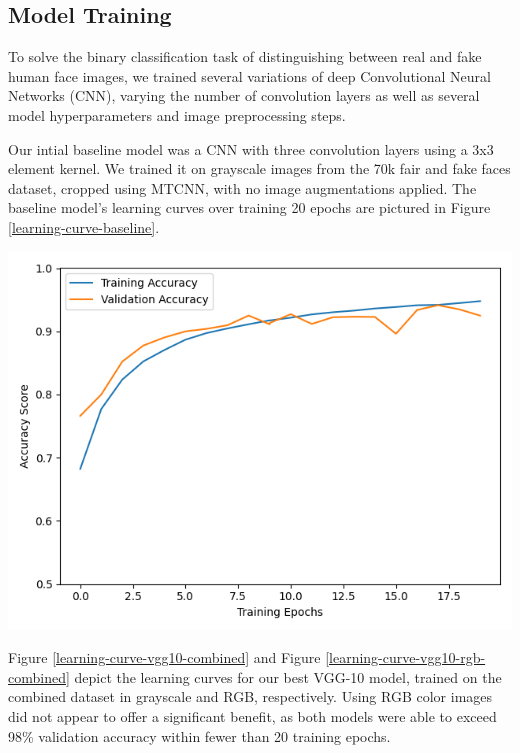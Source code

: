 \documentclass[11pt, letterpaper]{article}
\newenvironment{Figure}
  {\par\medskip\noindent\minipage{\linewidth}}
  {\endminipage\par\medskip}
\begin{document}
\begin{multicols}{2}
  \subsection{Model Training}

  To solve the binary classification task of distinguishing between
  real and fake human face images, we trained several variations of
  deep Convolutional Neural Networks (CNN), varying the number of
  convolution layers as well as several model hyperparameters and
  image preprocessing steps.

  Our intial baseline model was a CNN with three convolution layers
  using a 3x3 element kernel. We trained it on grayscale images from
  the 70k fair and fake faces dataset, cropped using MTCNN, with no
  image augmentations applied. The baseline model's learning curves
  over training 20 epochs are pictured in Figure
  \ref{learning-curve-baseline}.

  \begin{Figure}
    \centering
    \includegraphics[width=1.0\textwidth]{figures/learning-curve-baseline-cropped-grayscale-noaug.png}
    \label{learning-curve-baseline}
  \end{Figure}

  Figure \ref{learning-curve-vgg10-combined} and Figure
  \ref{learning-curve-vgg10-rgb-combined} depict the learning curves
  for our best VGG-10 model, trained on the combined dataset in
  grayscale and RGB, respectively. Using RGB color images did not
  appear to offer a significant benefit, as both models were able to
  exceed 98\% validation accuracy within fewer than 20 training
  epochs.


\end{multicols}
\end{document}
